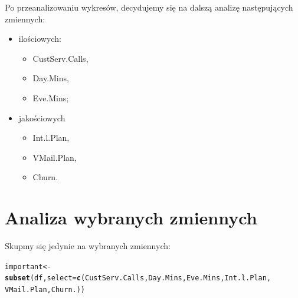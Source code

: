 \documentclass{article}\usepackage[]{graphicx}\usepackage[]{color}
\makeatletter
\newcommand{\hlstd}[1]{\textcolor[rgb]{0.345,0.345,0.345}{#1}}%
\newcommand{\hlkwb}[1]{\textcolor[rgb]{0.69,0.353,0.396}{#1}}%
\newcommand{\hlkwc}[1]{\textcolor[rgb]{0.333,0.667,0.333}{#1}}%
\newcommand{\hlkwd}[1]{\textcolor[rgb]{0.737,0.353,0.396}{\textbf{#1}}}%
\newenvironment{kframe}{%
 \def\at@end@of@kframe{}%
 \ifinner\ifhmode%
  \def\at@end@of@kframe{\end{minipage}}%
  \begin{minipage}{\columnwidth}%
 \fi\fi%
 \def\FrameCommand##1{\hskip\@totalleftmargin \hskip-\fboxsep
 \colorbox{shadecolor}{##1}\hskip-\fboxsep
     \hskip-\linewidth \hskip-\@totalleftmargin \hskip\columnwidth}%
 \MakeFramed {\advance\hsize-\width
   \@totalleftmargin\z@ \linewidth\hsize
   \@setminipage}}%
 {\par\unskip\endMakeFramed%
 \at@end@of@kframe}
\newenvironment{knitrout}{}{} %
\makeatother
\begin{document}
\begin{table}[!h]

\caption{\label{tab:tabela_3}Wyniki testu Kolmogorova-Smirnova}
\centering
{}
\end{table}


Po przeanalizowaniu wykresów, decydujemy się na dalszą analizę następujących zmiennych:
\begin{itemize}
  \item ilościowych:
    \begin{itemize}
    \item CustServ.Calls,
    \item Day.Mins,
    \item Eve.Mins;
    \end{itemize}
  \item jakościowych
    \begin{itemize}
    \item Int.l.Plan,
    \item VMail.Plan,
    \item Churn.
    \end{itemize}
\end{itemize}

\section{Analiza wybranych zmiennych}
Skupmy się jedynie na wybranych zmiennych:
\begin{knitrout}
\color{fgcolor}\begin{kframe}
\begin{alltt}
\hlstd{important} \hlkwb{<-} \hlkwd{subset}\hlstd{(df,} \hlkwc{select}\hlstd{=}\hlkwd{c}\hlstd{(CustServ.Calls, Day.Mins, Eve.Mins, Int.l.Plan,}
                                 \hlstd{VMail.Plan, Churn.))}
\end{alltt}
\end{kframe}
\end{knitrout}
\end{document}
